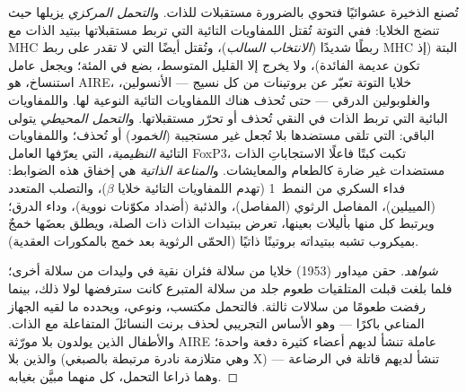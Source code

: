 \begin{definition}[التحمل]\label{def:b3:adaptive-immunity:tolerance}
تُصنع الذخيرة عشوائيًا فتحوي بالضرورة مستقبلات للذات.
و\emph{التحمل المركزي} يزيلها حيث تنضج الخلايا: ففي التوتة
تُقتل اللمفاويات التائية التي تربط مستقبلاتها ببتيد الذات
مع MHC ربطًا شديدًا (\emph{الانتخاب السالب})، وتُقتل أيضًا
التي لا تقدر على ربط MHC البتة (إذ تكون عديمة الفائدة)، ولا
يخرج إلا القليل المتوسط، بضع في المئة؛ ويجعل عامل استنساخ،
هو AIRE، خلايا التوتة تعبّر عن بروتينات من كل نسيج ---
الأنسولين، والغلوبولين الدرقي --- حتى تُحذف هناك اللمفاويات
التائية النوعية لها. واللمفاويات البائية التي تربط الذات في
النقي تُحذف أو تحرّر مستقبلاتها. و\emph{التحمل المحيطي}
يتولى الباقي:  التي تلقى مستضدها بلا
 تُجعل غير مستجيبة (\emph{الخمود}) أو تُحذف؛
واللمفاويات التائية \emph{النظيمية}، التي يعرّفها العامل
FoxP3، تكبت كبتًا فاعلًا الاستجاباتِ  الذات  مستضدات
غير ضارة كالطعام والمعايشات. و\emph{المناعة الذاتية} هي
إخفاق هذه الضوابط: فداء السكري من النمط~1 (تهدم اللمفاويات
التائية خلايا $\beta$)، والتصلب المتعدد (المييلين)، 
المفاصل الرثوي (المفاصل)، والذئبة (أضداد  مكوّنات نووية)،
وداء الدرق؛ ويرتبط كل منها بأليلات  بعينها، تعرض ببتيدات
الذات ذات الصلة، ويطلق بعضَها خمجٌ بميكروب تشبه ببتيداته
بروتينًا ذاتيًا (الحمّى الرثوية بعد خمج بالمكورات العقدية).
\end{definition}

\begin{proof}[شواهد]
حقن ميداور (1953) خلايا من سلالة فئران نقية في وليدات من
سلالة أخرى؛ فلما بلغت قبلت المتلقيات طعوم جلد من سلالة
المتبرع كانت سترفضها لولا ذلك، بينما رفضت طعومًا من سلالات
ثالثة. فالتحمل مكتسب، ونوعي، ويحدده ما لقيه الجهاز المناعي
باكرًا --- وهو الأساس التجريبي لحذف برنت النسائلَ المتفاعلة
مع الذات. والأطفال الذين يولدون بلا مورّثة AIRE عاملة تنشأ
لديهم   أعضاء كثيرة دفعة واحدة؛ والذين بلا
 (وهي متلازمة نادرة مرتبطة بالصبغي X) تنشأ لديهم  قاتلة في الرضاعة --- وهما ذراعا التحمل، كل منهما
مبيَّن بغيابه.
\end{proof}

